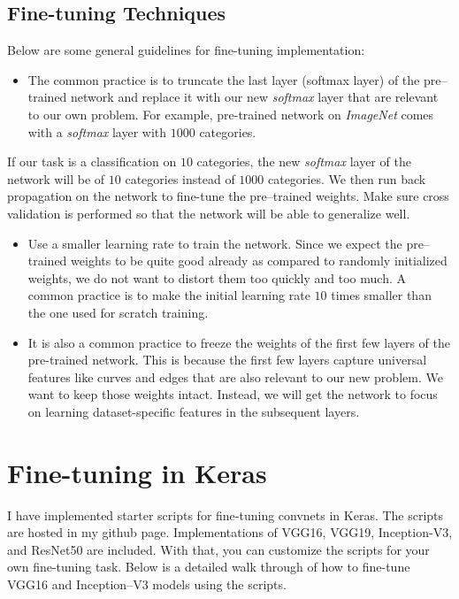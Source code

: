 \subsection{Fine-tuning Techniques}
\label{ssec:fine-tuning}
Below are some general guidelines for fine-tuning implementation:
\begin{itemize}
\item The common practice is to truncate the last layer (softmax layer) of the 
pre--trained network and replace it with our new \emph{softmax} layer that are 
relevant to our own problem. For example, pre-trained network on \emph{ImageNet} 
comes with a \emph{softmax} layer with $1000$ categories.
\end{itemize}
If our task is a classification on $10$ categories, the new \emph{softmax} layer
of the network will be of $10$ categories instead of $1000$ categories.
We then run back propagation on the network to fine-tune the pre--trained 
weights. Make sure cross validation is performed so that the network will be 
able to generalize well.
\begin{itemize}
\item  Use a smaller learning rate to train the network. 
Since we expect the pre--trained weights to be quite good already as compared 
to randomly initialized weights, we do not want to distort them too quickly and 
too much. 
A common practice is to make the initial learning rate $10$ times smaller than 
the one used for scratch training.
\item It is also a common practice to freeze the weights of the first few layers 
of the pre-trained network. 
This is because the first few layers capture universal features like curves and 
edges that are also relevant to our new problem. 
We want to keep those weights intact. Instead, we will get the network to 
focus on learning dataset-specific features in the subsequent layers.
\end{itemize}
%
\section{Fine-tuning in Keras}
\label{sec:finetuningkeras}
%
I have implemented starter scripts for fine-tuning convnets in Keras. 
The scripts are hosted in my github page.
Implementations of VGG16, VGG19, Inception-V3, and ResNet50 are included. 
With that, you can customize the scripts for your own fine-tuning task.
Below is a detailed walk through of how to fine-tune VGG16 and Inception--V3 
models using the scripts.
%
